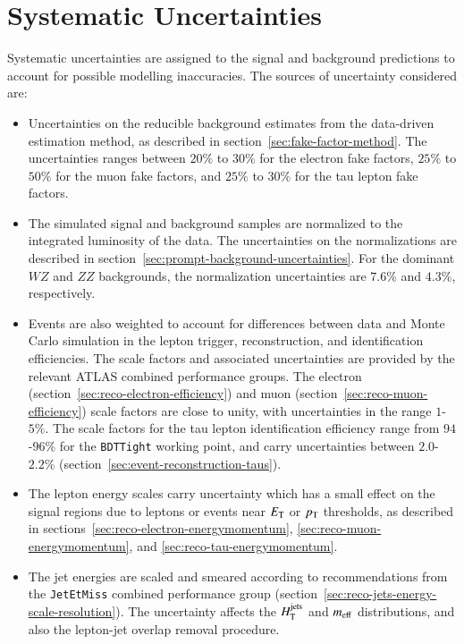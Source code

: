 \section{Systematic Uncertainties}\label{sec:model-independent-systematics}
Systematic uncertainties are assigned to the signal and background predictions to account for possible modelling inaccuracies. The sources of uncertainty considered are:

\begin{itemize}
	\item Uncertainties on the reducible background estimates from the data-driven estimation method, as described in section~\ref{sec:fake-factor-method}. The uncertainties ranges between $20\%$ to $30\%$ for the electron fake factors, $25\%$ to $50\%$ for the muon fake factors, and $25\%$ to $30\%$ for the tau lepton fake factors.

	\item The simulated signal and background samples are normalized to the integrated luminosity of the data. The uncertainties on the normalizations are described in section~\ref{sec:prompt-background-uncertainties}. For the dominant $WZ$ and $ZZ$ backgrounds, the normalization uncertainties are $7.6\%$ and $4.3\%$, respectively.

	\item Events are also weighted to account for differences between data and Monte Carlo simulation in the lepton trigger, reconstruction, and identification efficiencies. The scale factors and associated uncertainties are provided by the relevant ATLAS combined performance groups. The electron (section~\ref{sec:reco-electron-efficiency}) and muon (section~\ref{sec:reco-muon-efficiency}) scale factors are close to unity, with uncertainties in the range $1$-$5\%$. The scale factors for the tau lepton identification efficiency range from $94$-$96\%$ for the \texttt{BDTTight} working point, and carry uncertainties between $2.0$-$2.2\%$ (section~\ref{sec:event-reconstruction-taus}).

	\item The lepton energy scales carry uncertainty which has a small effect on the signal regions due to leptons or events near $E_{\mathrm{T}}$ or $p_{\text{T}}$ thresholds, as described in sections~\ref{sec:reco-electron-energymomentum}, \ref{sec:reco-muon-energymomentum}, and \ref{sec:reco-tau-energymomentum}.

	\item  The jet energies are scaled and smeared according to recommendations from the \texttt{JetEtMiss} combined performance group (section~\ref{sec:reco-jets-energy-scale-resolution}). The uncertainty affects the $H_{\mathrm{T}}^{\mathrm{jets}}$ and $m_{\mathrm{eff}}$ distributions, and also the lepton-jet overlap removal procedure.


\end{itemize}
